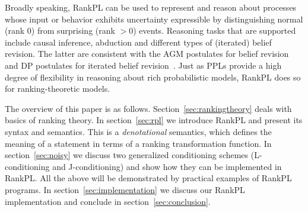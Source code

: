 \documentclass{llncs}
\begin{document}
Broadly speaking, RankPL can be used to represent and reason about processes
	whose input or behavior exhibits uncertainty expressible %
	by distinguishing normal (rank $0$) from surprising (rank $> 0$) events.
Reasoning tasks that are supported include causal inference, abduction and different types of (iterated) belief revision.
The latter are consistent with the AGM postulates for belief revision and DP postulates for iterated belief revision~\cite{DBLP:dblp_journals/ai/DarwicheP97,Gardenfors:1995:BR:216136.216138}.
Just as PPLs provide a high degree of flexibility in reasoning about rich probabilistic models, RankPL does so for ranking-theoretic models.

The overview of this paper is as follows.
Section~\ref{sec:rankingtheory} deals with basics of ranking theory.
In section~\ref{sec:rpl} we introduce RankPL and present its syntax and semantics.
This is a \emph{denotational} semantics, which defines the meaning of a statement in terms of a ranking transformation function.
In section~\ref{sec:noisy} we discuss two generalized conditioning schemes (L-conditioning and J-conditioning) and show how they can be implemented in RankPL.
All the above will be demonstrated by practical examples of RankPL programs.
In section~\ref{sec:implementation} we discuss our RankPL implementation 
	and conclude in section~\ref{sec:conclusion}.
\end{document}
